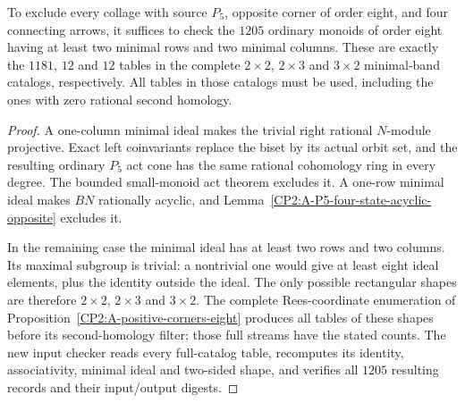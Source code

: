\begin{proposition}
\label{CP2:A-P5-eight-corner-scope}
To exclude every collage with source $P_5$, opposite corner
of order eight, and four connecting arrows, it suffices to
check the $1205$ ordinary monoids of order eight having at
least two minimal rows and two minimal columns. These are
exactly the $1181$, $12$ and $12$ tables in the complete
$2\times2$, $2\times3$ and $3\times2$ minimal-band catalogs,
respectively. All tables in those catalogs must be used,
including the ones with zero rational second homology.
\end{proposition}
\begin{proof}
A one-column minimal ideal makes the trivial right rational
$N$-module projective. Exact left coinvariants replace the
biset by its actual orbit set, and the resulting ordinary
$P_5$ act cone has the same rational cohomology ring in every
degree. The bounded small-monoid act theorem excludes it.
A one-row minimal ideal makes $BN$ rationally acyclic, and
Lemma~\ref{CP2:A-P5-four-state-acyclic-opposite} excludes it.

In the remaining case the minimal ideal has at least two
rows and two columns. Its maximal subgroup is trivial:
a nontrivial one would give at least eight ideal elements,
plus the identity outside the ideal. The only possible
rectangular shapes are therefore $2\times2$, $2\times3$
and $3\times2$. The complete Rees-coordinate enumeration
of Proposition~\ref{CP2:A-positive-corners-eight} produces
all tables of these shapes before its second-homology
filter; those full streams have the stated counts.
The new input checker
 reads every
full-catalog table, recomputes its identity, associativity,
minimal ideal and two-sided shape, and verifies all $1205$
resulting records and their input/output digests.
\end{proof}
